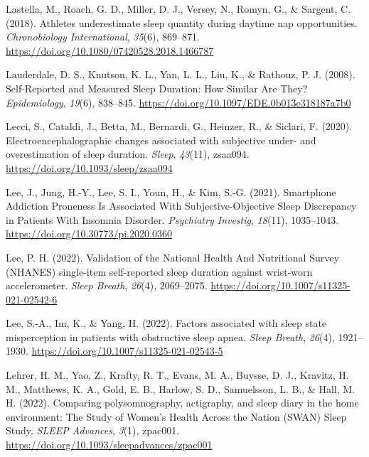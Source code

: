 \documentclass[
]{article}
\newlength{\cslhangindent}
\newenvironment{CSLReferences}[2] %
 {\begin{list}{}{%
  \setlength{\itemindent}{0pt}
  \setlength{\leftmargin}{0pt}
  \setlength{\parsep}{0pt}
  \ifodd #1
   \setlength{\leftmargin}{\cslhangindent}
   \setlength{\itemindent}{-1\cslhangindent}
  \fi
  \setlength{\itemsep}{#2\baselineskip}}}
 {\end{list}}
\begin{document}
\begin{CSLReferences}{1}{0}
Lastella, M., Roach, G. D., Miller, D. J., Versey, N., Romyn, G., \& Sargent, C. (2018). Athletes underestimate sleep quantity during daytime nap opportunities. \emph{Chronobiology International}, \emph{35}(6), 869--871. \url{https://doi.org/10.1080/07420528.2018.1466787}

Lauderdale, D. S., Knutson, K. L., Yan, L. L., Liu, K., \& Rathouz, P. J. (2008). Self-{Reported} and {Measured} {Sleep} {Duration}: {How} {Similar} {Are} {They}? \emph{Epidemiology}, \emph{19}(6), 838--845. \url{https://doi.org/10.1097/EDE.0b013e318187a7b0}

Lecci, S., Cataldi, J., Betta, M., Bernardi, G., Heinzer, R., \& Siclari, F. (2020). Electroencephalographic changes associated with subjective under- and overestimation of sleep duration. \emph{Sleep}, \emph{43}(11), zsaa094. \url{https://doi.org/10.1093/sleep/zsaa094}

Lee, J., Jung, H.-Y., Lee, S. I., Youn, H., \& Kim, S.-G. (2021). Smartphone {Addiction} {Proneness} {Is} {Associated} {With} {Subjective}-{Objective} {Sleep} {Discrepancy} in {Patients} {With} {Insomnia} {Disorder}. \emph{Psychiatry Investig}, \emph{18}(11), 1035--1043. \url{https://doi.org/10.30773/pi.2020.0360}

Lee, P. H. (2022). Validation of the {National} {Health} {And} {Nutritional} {Survey} ({NHANES}) single-item self-reported sleep duration against wrist-worn accelerometer. \emph{Sleep Breath}, \emph{26}(4), 2069--2075. \url{https://doi.org/10.1007/s11325-021-02542-6}

Lee, S.-A., Im, K., \& Yang, H. (2022). Factors associated with sleep state misperception in patients with obstructive sleep apnea. \emph{Sleep Breath}, \emph{26}(4), 1921--1930. \url{https://doi.org/10.1007/s11325-021-02543-5}

Lehrer, H. M., Yao, Z., Krafty, R. T., Evans, M. A., Buysse, D. J., Kravitz, H. M., Matthews, K. A., Gold, E. B., Harlow, S. D., Samuelsson, L. B., \& Hall, M. H. (2022). Comparing polysomnography, actigraphy, and sleep diary in the home environment: {The} {Study} of {Women}'s {Health} {Across} the {Nation} ({SWAN}) {Sleep} {Study}. \emph{SLEEP Advances}, \emph{3}(1), zpac001. \url{https://doi.org/10.1093/sleepadvances/zpac001}


\end{CSLReferences}
\end{document}

